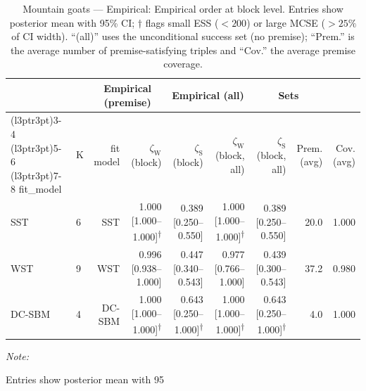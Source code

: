\begin{table}
\centering
\caption{\label{tab:tab:mountain-goats-empirical-emp-block}Mountain goats — Empirical: Empirical order at block level. Entries show posterior mean with 95\% CI; $\dagger$ flags small ESS ($<200$) or large MCSE ($>25\%$ of CI width). “(all)” uses the unconditional success set (no premise); “Prem.” is the average number of premise-satisfying triples and “Cov.” the average premise coverage.}
\centering
\begin{threeparttable}
\begin{tabular}[t]{llrrrrrrr}
\toprule
\multicolumn{2}{c}{ } & \multicolumn{2}{c}{Empirical (premise)} & \multicolumn{2}{c}{Empirical (all)} & \multicolumn{2}{c}{Sets} \\
\cmidrule(l{3pt}r{3pt}){3-4} \cmidrule(l{3pt}r{3pt}){5-6} \cmidrule(l{3pt}r{3pt}){7-8}
fit_model & K & fit model & $\zeta_{\mathrm{W}}$ (block) & $\zeta_{\mathrm{S}}$ (block) & $\zeta_{\mathrm{W}}$ (block, all) & $\zeta_{\mathrm{S}}$ (block, all) & Prem. (avg) & Cov. (avg)\\
\midrule
SST & 6 & SST & 1.000 [1.000--1.000]\textsuperscript{$\dagger$} & 0.389 [0.250--0.550] & 1.000 [1.000--1.000]\textsuperscript{$\dagger$} & 0.389 [0.250--0.550] & 20.0 & 1.000\\
WST & 9 & WST & 0.996 [0.938--1.000] & 0.447 [0.340--0.543] & 0.977 [0.766--1.000] & 0.439 [0.300--0.543] & 37.2 & 0.980\\
DC-SBM & 4 & DC-SBM & 1.000 [1.000--1.000]\textsuperscript{$\dagger$} & 0.643 [0.250--1.000]\textsuperscript{$\dagger$} & 1.000 [1.000--1.000]\textsuperscript{$\dagger$} & 0.643 [0.250--1.000]\textsuperscript{$\dagger$} & 4.0 & 1.000\\
\bottomrule
\end{tabular}
\begin{tablenotes}
\item \textit{Note: } 
\item Entries show posterior mean with 95%
\end{tablenotes}
\end{threeparttable}
\end{table}